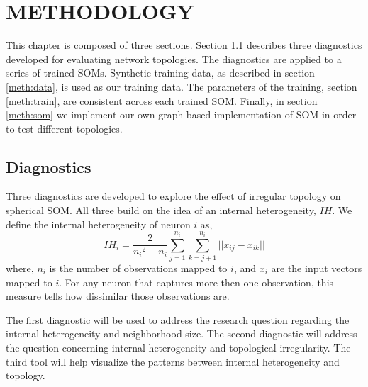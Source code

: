\chapter{METHODOLOGY}
This chapter is composed of three sections.  Section \ref{meth:diag} describes
three diagnostics developed for evaluating network topologies.  The
diagnostics are applied to a series of trained SOMs.  Synthetic training data,
as described in section \ref{meth:data}, is used as our training data.  The
parameters of the training, section \ref{meth:train}, are consistent across
each trained SOM. Finally, in section \ref{meth:som} we implement our own
graph based implementation of SOM in order to test different topologies.

\section{Diagnostics}
\label{meth:diag}
Three diagnostics are developed to explore the effect of irregular topology on
spherical SOM.  All three build on the idea of an internal heterogeneity,
\(IH\). We define the internal heterogeneity of neuron \(i\) as,
 \begin{equation}
   {IH_i} = \frac{2}{{n_i}^2-{n_i}}\sum_{j=1}^{n_i}\sum_{k=j+1}^{n_i} ||{x_{ij}}-{x_{ik}}||
 \label{eqno1}
 \end{equation}
where, \(n_i\) is the number of observations mapped to \(i\), and \(x_i\) are
the input vectors mapped to \(i\).  For any neuron that captures more then one
observation, this measure tells how dissimilar those observations are.

The first diagnostic will be used to address the research question regarding
the internal heterogeneity and neighborhood size.  The second diagnostic will
address the question concerning internal heterogeneity and topological
irregularity.  The third tool will help visualize the patterns between
internal heterogeneity and topology.


